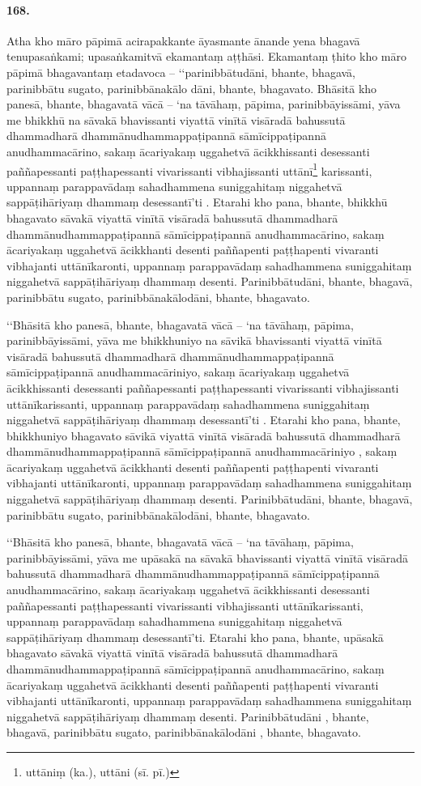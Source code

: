 \paragraph{168.} Atha kho māro pāpimā acirapakkante āyasmante ānande yena bhagavā tenupasaṅkami; upasaṅkamitvā ekamantaṃ aṭṭhāsi. Ekamantaṃ ṭhito kho māro pāpimā bhagavantaṃ etadavoca – ‘‘parinibbātudāni, bhante, bhagavā, parinibbātu sugato, parinibbānakālo dāni, bhante, bhagavato. Bhāsitā kho panesā, bhante, bhagavatā vācā – ‘na tāvāhaṃ, pāpima, parinibbāyissāmi, yāva me bhikkhū na sāvakā bhavissanti viyattā vinītā visāradā bahussutā dhammadharā dhammānudhammappaṭipannā sāmīcippaṭipannā anudhammacārino, sakaṃ ācariyakaṃ uggahetvā ācikkhissanti desessanti paññapessanti paṭṭhapessanti vivarissanti vibhajissanti uttānī\footnote{uttāniṃ (ka.), uttāni (sī. pī.)} karissanti, uppannaṃ parappavādaṃ sahadhammena suniggahitaṃ niggahetvā sappāṭihāriyaṃ dhammaṃ desessantī’ti . Etarahi kho pana, bhante, bhikkhū bhagavato sāvakā viyattā vinītā visāradā bahussutā dhammadharā dhammānudhammappaṭipannā sāmīcippaṭipannā anudhammacārino, sakaṃ ācariyakaṃ uggahetvā ācikkhanti desenti paññapenti paṭṭhapenti vivaranti vibhajanti uttānīkaronti, uppannaṃ parappavādaṃ sahadhammena suniggahitaṃ niggahetvā sappāṭihāriyaṃ dhammaṃ desenti. Parinibbātudāni, bhante, bhagavā, parinibbātu sugato, parinibbānakālodāni, bhante, bhagavato.

‘‘Bhāsitā kho panesā, bhante, bhagavatā vācā – ‘na tāvāhaṃ, pāpima, parinibbāyissāmi, yāva me bhikkhuniyo na sāvikā bhavissanti viyattā vinītā visāradā bahussutā dhammadharā dhammānudhammappaṭipannā sāmīcippaṭipannā anudhammacāriniyo, sakaṃ ācariyakaṃ uggahetvā ācikkhissanti desessanti paññapessanti paṭṭhapessanti vivarissanti vibhajissanti uttānīkarissanti, uppannaṃ parappavādaṃ sahadhammena suniggahitaṃ niggahetvā sappāṭihāriyaṃ dhammaṃ desessantī’ti . Etarahi kho pana, bhante, bhikkhuniyo bhagavato sāvikā viyattā vinītā visāradā bahussutā dhammadharā dhammānudhammappaṭipannā sāmīcippaṭipannā anudhammacāriniyo , sakaṃ ācariyakaṃ uggahetvā ācikkhanti desenti paññapenti paṭṭhapenti vivaranti vibhajanti uttānīkaronti, uppannaṃ parappavādaṃ sahadhammena suniggahitaṃ niggahetvā sappāṭihāriyaṃ dhammaṃ desenti. Parinibbātudāni, bhante, bhagavā, parinibbātu sugato, parinibbānakālodāni, bhante, bhagavato.

‘‘Bhāsitā kho panesā, bhante, bhagavatā vācā – ‘na tāvāhaṃ, pāpima, parinibbāyissāmi, yāva me upāsakā na sāvakā bhavissanti viyattā vinītā visāradā bahussutā dhammadharā dhammānudhammappaṭipannā sāmīcippaṭipannā anudhammacārino, sakaṃ ācariyakaṃ uggahetvā ācikkhissanti desessanti paññapessanti paṭṭhapessanti vivarissanti vibhajissanti uttānīkarissanti, uppannaṃ parappavādaṃ sahadhammena suniggahitaṃ niggahetvā sappāṭihāriyaṃ dhammaṃ desessantī’ti. Etarahi kho pana, bhante, upāsakā bhagavato sāvakā viyattā vinītā visāradā bahussutā dhammadharā dhammānudhammappaṭipannā sāmīcippaṭipannā anudhammacārino, sakaṃ ācariyakaṃ uggahetvā ācikkhanti desenti paññapenti paṭṭhapenti vivaranti vibhajanti uttānīkaronti, uppannaṃ parappavādaṃ sahadhammena suniggahitaṃ niggahetvā sappāṭihāriyaṃ dhammaṃ desenti. Parinibbātudāni , bhante, bhagavā, parinibbātu sugato, parinibbānakālodāni , bhante, bhagavato.

